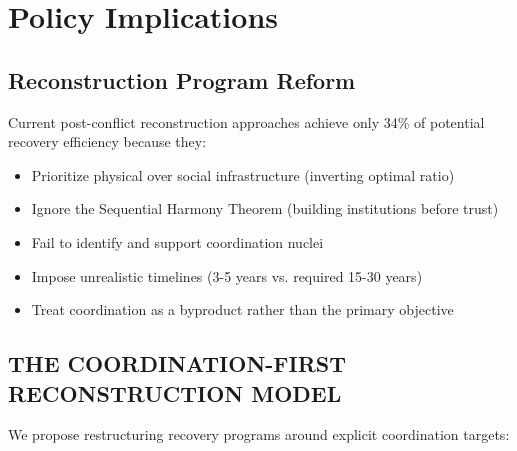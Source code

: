 \documentclass[11pt,letterpaper]{article}
\begin{document}
\section{Policy Implications}

\subsection{Reconstruction Program Reform}

Current post-conflict reconstruction approaches achieve only 34\% of potential recovery efficiency because they:
\begin{itemize}
\item Prioritize physical over social infrastructure (inverting optimal ratio)
\item Ignore the Sequential Harmony Theorem (building institutions before trust)
\item Fail to identify and support coordination nuclei
\item Impose unrealistic timelines (3-5 years vs. required 15-30 years)
\item Treat coordination as a byproduct rather than the primary objective
\end{itemize}

\subsection{THE COORDINATION-FIRST RECONSTRUCTION MODEL}

We propose restructuring recovery programs around explicit coordination targets:
\end{document}

